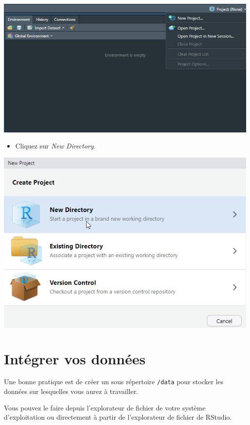 \documentclass[]{book}
\providecommand{\tightlist}{%
  \setlength{\itemsep}{0pt}\setlength{\parskip}{0pt}}
\begin{document}
\includegraphics[width=5.20833in,height=\textheight]{images/creerprojet1.png}

\begin{itemize}
\tightlist
\item
  Cliquez sur \emph{New Directory}.
\end{itemize}

\includegraphics[width=5.20833in,height=\textheight]{images/creerprojet2.png}

\hypertarget{integrer-vos-donnees}{%
\section{Intégrer vos données}\label{integrer-vos-donnees}}

Une bonne pratique est de créer un sous répertoire \texttt{/data} pour stocker les données sur lesquelles vous aurez à travailler.

Vous pouvez le faire depuis l'explorateur de fichier de votre système d'exploitation ou directement à partir de l'explorateur de fichier de RStudio.
\end{document}
